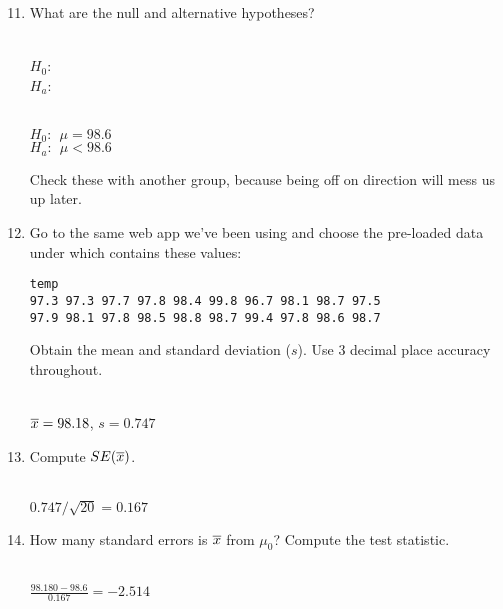 \begin{enumerate}
\setcounter{enumi}{10}
\item  What are the null and alternative hypotheses?  
\begin{students}
\\$H_0$:  \vspace{1cm}\\
$H_a$:  \vspace{1cm}
\end{students}
\begin{key}
\\ $H_0:\ \ \mu = 98.6$\\
$H_a:\ \ \mu<98.6$
\end{key}

Check these with another group, because being off on
direction will mess us up later.

\item  
Go to the same web app we've been using and choose the pre-loaded
 data under  which contains these values:
\begin{verbatim}
temp
97.3 97.3 97.7 97.8 98.4 99.8 96.7 98.1 98.7 97.5
97.9 98.1 97.8 98.5 98.8 98.7 99.4 97.8 98.6 98.7
\end{verbatim}
 Obtain the mean and standard deviation ($s$). Use 3 decimal
  place accuracy throughout.
\begin{students}
  \vspace{1cm}
\end{students}
\begin{key}
\\ $\overline{x} = 98.18$,  $s = 0.747$
\end{key}

\item Compute $SE(\overline{x})$.
\begin{students}
  \vspace{1cm}
\end{students}
\begin{key}
\\ {\it $0.747/\sqrt{20} = 0.167$}
\end{key}

\item How many standard errors is $\overline{x}$ from $\mu_0$?  Compute the
  test statistic. 
\begin{students}
  \vspace{1cm}
\end{students}
\begin{key}
\\ {\it $ \frac{98.180 - 98.6}{0.167} = -2.514$}
\end{key}



\end{enumerate}
